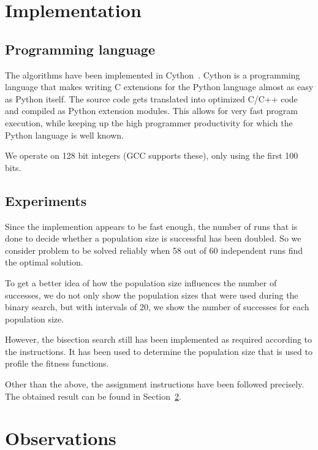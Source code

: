 \documentclass[12pt]{article}
\theoremstyle{definition}
\begin{document}
\maketitle

\section{Implementation}

\subsection*{Programming language}
The algorithms have been implemented in Cython~\cite{cython}.
Cython is a programming language that makes writing C extensions for the Python language almost as easy as Python itself.
The source code gets translated into optimized C/C++ code and compiled as Python extension modules.
This allows for very fast program execution, while keeping up the high programmer productivity for which the Python language is well known.

We operate on 128 bit integers (GCC supports these), only using the first 100 bits.

\subsection*{Experiments}
Since the implemention appears to be fast enough, the number of runs that is done to decide whether a population size is successful has been doubled.
So we consider problem to be solved reliably when 58 out of 60 independent runs find the optimal solution.

To get a better idea of how the population size influences the number of successes, we do not only show the population sizes that were used during the binary search, but with intervals of 20, we show the number of successes for each population size.

However, the bisection search still has been implemented as required according to the instructions.
It has been used to determine the population size that is used to profile the fitness functions.

Other than the above, the assignment instructions have been followed precisely.
The obtained result can be found in Section~\ref{observations}.


\section{Observations}
\label{observations}
\end{document}
